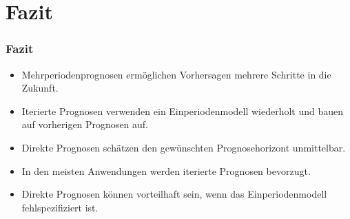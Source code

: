 \documentclass[10pt,aspectratio=169]{beamer}\usepackage[]{graphicx}\usepackage[]{xcolor}
\begin{document}
\section*{Fazit}



\begin{frame}
  \frametitle{Fazit}

  \begin{itemize}
    \item Mehrperiodenprognosen ermöglichen Vorhersagen mehrere Schritte in die Zukunft.

    \item Iterierte Prognosen verwenden ein Einperiodenmodell wiederholt und bauen auf vorherigen Prognosen auf.

    \item Direkte Prognosen schätzen den gewünschten Prognosehorizont unmittelbar.

    \item In den meisten Anwendungen werden iterierte Prognosen bevorzugt.

    \item Direkte Prognosen können vorteilhaft sein, wenn das Einperiodenmodell fehlspezifiziert ist.
  \end{itemize}

\end{frame}



% 
%   
%   
% 
\end{document}
